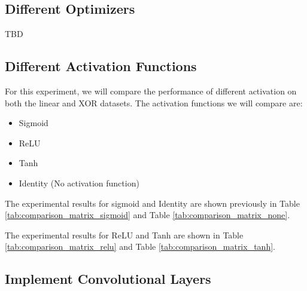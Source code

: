 \subsection{Different Optimizers}

TBD

\subsection{Different Activation Functions}

For this experiment, we will compare the performance of different activation on both the linear and XOR datasets.
The activation functions we will compare are:
\begin{itemize}
    \item Sigmoid
    \item ReLU
    \item Tanh
    \item Identity (No activation function)
\end{itemize}

The experimental results for sigmoid and Identity are shown previously in Table \ref{tab:comparison_matrix_sigmoid} and Table \ref{tab:comparison_matrix_none}.

The experimental results for ReLU and Tanh are shown in Table \ref{tab:comparison_matrix_relu} and Table \ref{tab:comparison_matrix_tanh}.


\subsection{Implement Convolutional Layers}

